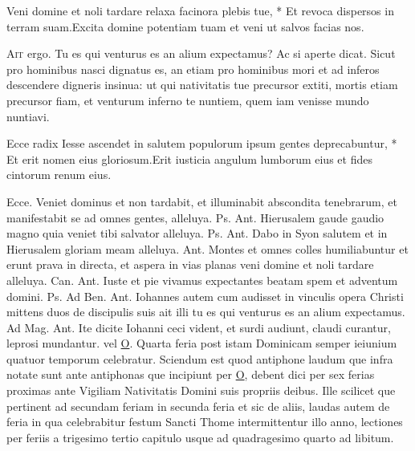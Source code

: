\begin{multicols*}{2}
\begin{responsory}
{Veni domine et noli tardare relaxa facinora plebis tue, * Et revoca dispersos in terram suam.}{Excita domine potentiam tuam et veni ut salvos facias nos.}
\end{responsory}
\lettrine[lines=2]{\zallmancaps \color{Red} A}{it} ergo. Tu es qui venturus es an alium expectamus? Ac si aperte dicat. Sicut pro hominibus nasci dignatus es, an etiam pro hominibus mori et ad inferos descendere digneris insinua: ut qui nativitatis tue precursor extiti, mortis etiam precursor fiam, et venturum inferno te nuntiem, quem iam venisse mundo nuntiavi.
\begin{responsory-doxology}
{Ecce radix Iesse ascendet in salutem populorum ipsum gentes deprecabuntur, * Et erit nomen eius gloriosum.}{Erit iusticia angulum lumborum eius et fides cintorum renum eius.}
\end{responsory-doxology}
Ecce.
 Veniet dominus et non tardabit, et illuminabit abscondita tenebrarum, et manifestabit se ad omnes gentes, alleluya. {\color{Red} Ps.}  {\color{Red} Ant.} Hierusalem gaude gaudio magno quia veniet tibi salvator alleluya. {\color{Red} Ps.}  {\color{Red} Ant.} Dabo in Syon salutem et in Hierusalem gloriam meam alleluya.  {\color{Red} Ant.} Montes et omnes colles humiliabuntur et erunt prava in directa, et aspera in vias planas veni domine et noli tardare alleluya. {\color{Red} Can.}  {\color{Red} Ant.} Iuste et pie vivamus expectantes beatam spem et adventum domini. {\color{Red} Ps.}  {\color{Red} Ad Ben. Ant.} Iohannes autem cum audisset in vinculis opera Christi mittens duos de discipulis suis ait illi tu es qui venturus es an alium expectamus. {\color{Red} Ad Mag. Ant.} Ite dicite Iohanni ceci vident, et surdi audiunt, claudi curantur, leprosi mundantur. {\color{Red} vel} \hyperlink{o-antiphons}{O}.
\newline Quarta feria post istam Dominicam semper ieiunium quatuor temporum celebratur. Sciendum est quod antiphone laudum que infra notate sunt ante antiphonas que incipiunt per \hyperlink{o-antiphons}{O}, debent dici per sex ferias proximas ante Vigiliam Nativitatis Domini suis propriis deibus. Ille scilicet que pertinent ad secundam feriam in secunda feria et sic de aliis, laudas autem de feria in qua celebrabitur festum Sancti Thome intermittentur illo anno, lectiones per feriis a trigesimo tertio capitulo usque ad quadragesimo quarto ad libitum.

\end{multicols*}
